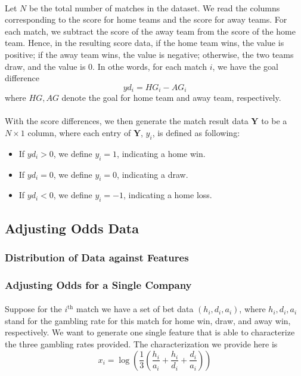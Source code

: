 \documentclass[12pt]{article}
\begin{document}
\paragraph{} 
Let $N$ be the total number of matches in the dataset. We read the columns corresponding to the score for home teams and the score for away teams. For each match, we subtract the score of the away team from the score of the home team. Hence, in the resulting score data, if the home team wins, the value is positive; if the away team wins, the value is negative; otherwise, the two teams draw, and the value is 0. In othe words, for each match $i$, we have the goal difference \[
yd_i = HG_i - AG_i
\] where $HG, AG$ denote the goal for home team and away team, respectively.
\paragraph{}
With the score differences, we then generate the match result data $\mathbf{Y}$ to be a $N \times 1$ column, where each entry of $\mathbf{Y}$, $y_i$, is defined as following:
\begin{itemize}
 \item If $yd_i > 0$, we define  $y_i = 1$, indicating a home win.
 \item If $yd_i = 0$, we define $y_i = 0$, indicating a draw.
 \item If $yd_i < 0$, we define $y_i = -1$, indicating a home loss.
\end{itemize}

\subsection{Adjusting Odds Data}
\subsubsection{Distribution of Data against Features}
\subsubsection{Adjusting Odds for a Single Company}
\paragraph{}
Suppose for the $i^{\text{th}}$ match we have a set of bet data $(h_i, d_i, a_i)$, where $h_i, d_i, a_i$ stand for the gambling rate for this match for home win, draw, and away win, respectively. We want to generate one single feature that is able to characterize the three gambling rates provided. The characterization we provide here is \[
x_i = \log(\frac{1}{3}(\frac{h_i}{a_i} + \frac{h_i}{d_i} + \frac{d_i}{a_i}))
\]
\end{document}

